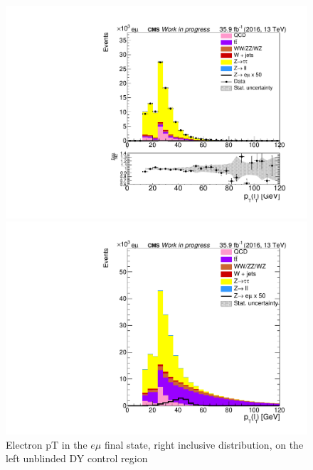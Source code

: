 \begin{figure}[htp]
	\centering

	\begin{multicols}{2}
		\includegraphics[width=\linewidth]{plots/em/TransverseMomentum1_CR.pdf}\par
		\includegraphics[width=\linewidth]{plots/em/TransverseMomentum1_withsignal.pdf}\par
	\end{multicols}

	\caption[Visible Z boson \gls{pT}]{Electron \gls{pT} in the $e\mu$ final state, right inclusive distribution, on the left unblinded \gls{DY} control region}
	\label{fig:LPT}
\end{figure}



